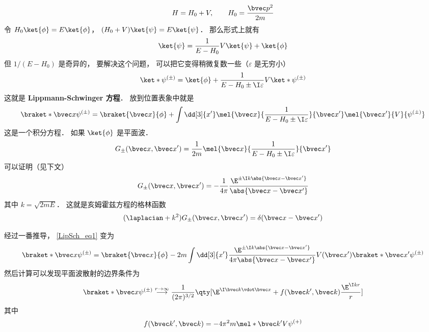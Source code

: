 

\begin{equation}
H = H_0 + V, \qquad H_0 = \frac{\bvec p^2}{2m}
\end{equation}
令 $H_0\ket{\phi} = E\ket{\phi}$， $(H_0+V)\ket{\psi}=E\ket{\psi}$． 那么形式上就有
\begin{equation}
\ket{\psi} = \frac{1}{E-H_0} V\ket{\psi} + \ket{\phi}
\end{equation}
但 $1/(E-H_0)$ 是奇异的， 要解决这个问题， 可以把它变得稍微复数一些（$\varepsilon$ 是无穷小）
\begin{equation}
\ket*{\psi^{(\pm)}} = \ket{\phi} + \frac{1}{E-H_0\pm \I\varepsilon} V \ket*{\psi^{(\pm)}}
\end{equation}
这就是 \textbf{Lippmann-Schwinger 方程}． 放到位置表象中就是
\begin{equation}\label{LipSch_eq1}
\braket*{\bvec x}{\psi^{(\pm)}} = \braket{\bvec x}{\phi} + \int \dd[3]{x'} \mel{\bvec x}{\frac{1}{E-H_0\pm \I\varepsilon}}{\bvec x'} \mel{\bvec x'}{V}{\psi^{(\pm)}}
\end{equation}
这是一个积分方程． 如果 $\ket{\phi}$ 是平面波．
\begin{equation}\label{LipSch_eq2}
G_\pm (\bvec x, \bvec x') = \frac{1}{2m} \mel{\bvec x}{\frac{1}{E-H_0\pm \I\varepsilon}}{\bvec x'}
\end{equation}
可以证明（见下文）
\begin{equation}\label{LipSch_eq3}
G_\pm (\bvec x, \bvec x') = -\frac{1}{4\pi} \frac{\E^{\pm\I k\abs{\bvec x-\bvec x'}}}{\abs{\bvec x-\bvec x'}}
\end{equation}
其中 $k = \sqrt{2mE}$． 这就是亥姆霍兹方程的格林函数
\begin{equation}
(\laplacian +k^2)G_\pm (\bvec x, \bvec x') = \delta(\bvec x-\bvec x')
\end{equation}

经过一番推导， \autoref{LipSch_eq1} 变为
\begin{equation}
\braket*{\bvec x}{\psi^{(\pm)}} = \braket{\bvec x}{\phi} - 2m\int \dd[3]{x'} \frac{\E^{\pm\I k\abs{\bvec x-\bvec x'}}}{4\pi\abs{\bvec x-\bvec x'}} V(\bvec x')\braket*{\bvec x'}{\psi^{(\pm)}}
\end{equation}
然后计算可以发现平面波散射的边界条件为
\begin{equation}
\braket*{\bvec x}{\psi^{(\pm)}} \overset{r\to\infty}{\longrightarrow} \frac{1}{(2\pi)^{3/2}} \qty[\E^{\I \bvec k\vdot \bvec x} + f(\bvec k', \bvec k)\frac{\E^{\I kr}}{r}]
\end{equation}
其中
\begin{equation}
f(\bvec k', \bvec k) = -4\pi^2 m \mel*{\bvec k'}{V}{\psi^{(+)}}
\end{equation}

